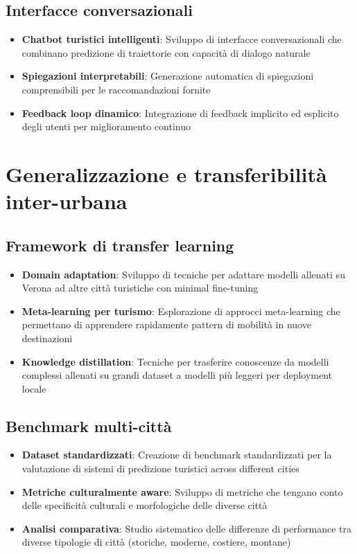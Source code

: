 \subsection{Interfacce conversazionali}
\begin{itemize}
\item \textbf{Chatbot turistici intelligenti}: Sviluppo di interfacce conversazionali che combinano predizione di traiettorie con capacità di dialogo naturale
\item \textbf{Spiegazioni interpretabili}: Generazione automatica di spiegazioni comprensibili per le raccomandazioni fornite
\item \textbf{Feedback loop dinamico}: Integrazione di feedback implicito ed esplicito degli utenti per miglioramento continuo
\end{itemize}

\section{Generalizzazione e transferibilità inter-urbana}

\subsection{Framework di transfer learning}
\begin{itemize}
\item \textbf{Domain adaptation}: Sviluppo di tecniche per adattare modelli allenati su Verona ad altre città turistiche con minimal fine-tuning
\item \textbf{Meta-learning per turismo}: Esplorazione di approcci meta-learning che permettano di apprendere rapidamente pattern di mobilità in nuove destinazioni
\item \textbf{Knowledge distillation}: Tecniche per trasferire conoscenze da modelli complessi allenati su grandi dataset a modelli più leggeri per deployment locale
\end{itemize}

\subsection{Benchmark multi-città}
\begin{itemize}
\item \textbf{Dataset standardizzati}: Creazione di benchmark standardizzati per la valutazione di sistemi di predizione turistici across different cities
\item \textbf{Metriche culturalmente aware}: Sviluppo di metriche che tengano conto delle specificità culturali e morfologiche delle diverse città
\item \textbf{Analisi comparativa}: Studio sistematico delle differenze di performance tra diverse tipologie di città (storiche, moderne, costiere, montane)
\end{itemize}

